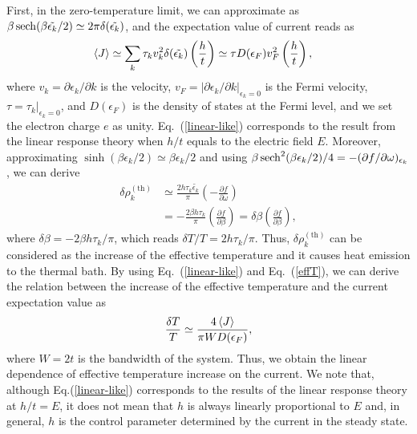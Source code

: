 \documentclass[a4paper, amsfonts, amssymb, amsmath, reprint, showkeys, nofootinbib, twoside,superscriptaddress, prl]{revtex4-2}
\newcommand{\mr}[1]{\mathrm{#1}}
\newcommand{\epk}{\epsilon_k}
\newcommand{\epkp}{\epsilon_{k'}}
\newcommand{\p}{\partial}
\begin{document}
First, in the zero-temperature limit, we can approximate as $\beta\sech(\beta\tilde{\epk}/2)\simeq 2\pi \delta(\tilde{\epk})$, and the expectation value of current  reads as
\begin{align}
    \ev{J} &\simeq \sum_k \tau_k v_k^2\delta(\tilde{\epk}) \left(\frac{h}{t}\right)\simeq \tau D(\epsilon_F) v^2_F \left(\frac{h}{t}\right),\label{linear-like}%
\end{align}
where $v_k = \p\epk/\p k$ is the velocity, $v_F = |\p\epk/\p k|_{\epk=0}$ is the Fermi velocity, $\tau = \tau_k|_{\epk=0}$, and $D(\epsilon_F)$ is the density of states at the Fermi level, and we set the electron charge $e$ as unity. 
Eq.~(\ref{linear-like}) corresponds to the result from the linear response theory when $h/t$ equals to the electric field $E$.
Moreover, approximating $\sinh(\beta\epk/2)\simeq \beta\epk/2$ and using $\beta\sech^2(\beta\epk/2)/4=-(\p f/\p\omega)_{\epk}$, we can derive
\begin{align}
    \delta\rho^{(\mr{th})}_k&\simeq \frac{2h\tau_k \tilde{\epk}}{\pi} \left(-\frac{\p f}{\p\omega}\right) \\
    &= -\frac{2\beta h\tau_k}{\pi} \left(\frac{\p f}{\p\beta}\right) = \delta\beta\left(\frac{\p f}{\p\beta}\right),\label{effT}
\end{align}
where $\delta\beta = -2\beta h \tau_k/\pi$, which reads $\delta T/T = 2 h\tau_k/\pi$. Thus, $\delta\rho_k^{(\mr{th})}$ can be considered as the increase of the effective temperature and it causes heat emission to the thermal bath. By using Eq.~(\ref{linear-like}) and Eq.~(\ref{effT}), we can derive the relation between the increase of the effective temperature and the current expectation value as
\begin{align}
    \frac{\delta T}{T} \simeq \frac{4 \ev{J}}{\pi WD(\epsilon_F)},
\end{align}
where $W = 2t$ is the bandwidth of the system.
Thus, we obtain the linear dependence of effective temperature increase on the current. We note that, although Eq.(\ref{linear-like}) corresponds to the results of the linear response theory at $h/t = E$, it does not mean that $h$ is always linearly proportional to $E$ and, in general, $h$ is the control parameter determined by the current in the steady state.
\end{document}
